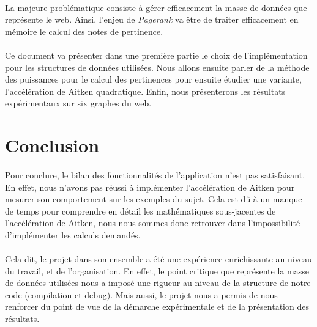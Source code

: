 		\paragraph{}La majeure problématique consiste à gérer efficacement la masse de données que représente le web. Ainsi, l'enjeu de \textit{Pagerank} va être de traiter efficacement en mémoire le calcul des notes de pertinence.
		\paragraph{}Ce document va présenter dans une première partie le choix de l'implémentation pour les structures de données utilisées. Nous allons ensuite parler de la méthode des puissances pour le calcul des pertinences pour ensuite étudier une variante, l'accélération de Aitken quadratique. Enfin, nous présenterons les résultats expérimentaux sur six graphes du web.
		
	
	
	
	
	
	\section*{Conclusion}
		\paragraph{}Pour conclure, le bilan des fonctionnalités de l'application n'est pas satisfaisant. En effet, nous n'avons pas réussi à implémenter l'accélération de Aitken pour mesurer son comportement sur les exemples du sujet. Cela est dû à un manque de temps pour comprendre en détail les mathématiques sous-jacentes de l'accélération de Aitken, nous nous sommes donc retrouver dans l'impossibilité d'implémenter les calculs demandés.
		\paragraph{}Cela dit, le projet dans son ensemble a été une expérience enrichissante au niveau du travail, et de l'organisation. En effet, le point critique que représente la masse de données utilisées nous a imposé une rigueur au niveau de la structure de notre code (compilation et debug). Mais aussi, le projet nous a permis de nous renforcer du point de vue de la démarche expérimentale et de la présentation des résultats.
		
		


